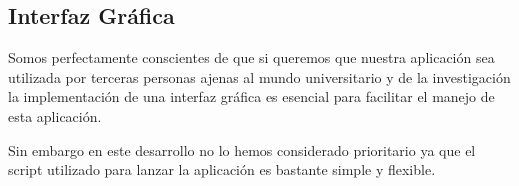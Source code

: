 \subsection*{Interfaz Gráfica}
Somos perfectamente conscientes de que si queremos que nuestra aplicación sea
utilizada por terceras personas ajenas al mundo universitario y de la
investigación la implementación de una interfaz gráfica es esencial para
facilitar el manejo de esta aplicación.

Sin embargo en este desarrollo no lo hemos considerado prioritario ya que
el script utilizado para lanzar la aplicación es bastante simple y flexible.


